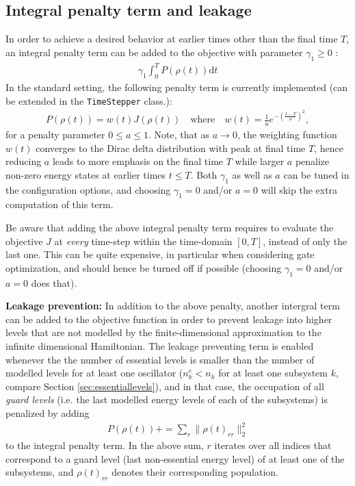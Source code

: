 \documentclass[11pt]{article}
\begin{document}
\subsection{Integral penalty term and leakage}\label{sec:penalty}
In order to achieve a desired behavior at earlier times other than the final time $T$, an integral penalty term can be added to the objective with parameter $\gamma_1 \geq 0$ :
\begin{align}\label{eq:penaltyterm0}
 \gamma_1 \int_0^T P(\rho(t)) \mathrm{d}t
\end{align}
In the standard setting, the following penalty term is currently implemented (can be extended in the \texttt{TimeStepper} class.):
\begin{align}\label{eq:penaltyterm}
  P(\rho(t))  =  w(t) J\left(\rho(t)\right) \quad \text{where} \quad w(t) =
  \frac{1}{a} e^{ -\left(\frac{t-T}{a} \right)^2},
\end{align}
for a penalty parameter $0 \leq a \leq 1$. Note, that as $a\to 0$, the weighting function $w(t)$ converges to the Dirac delta distribution with peak at final time $T$, hence reducing $a$ leads to more emphasis on the final time $T$ while larger $a$ penalize non-zero energy states at earlier times $t\leq T$. Both $\gamma_1$ as well as $a$ can be tuned in the configuration options, and choosing $\gamma_1 = 0$ and/or $a=0$ will skip the extra computation of this term. 

Be aware that adding the above integral penalty term requires to evaluate the objective $J$ at \textit{every} time-step within the time-domain $[0,T]$, instead of only the last one. This can be quite expensive, in particular when considering gate optimization, and should hence be turned off if possible (choosing $\gamma_1=0$ and/or $a=0$ does that).

\textbf{Leakage prevention:}
In addition to the above penalty, another intergral term can be added to the objective function in order to prevent leakage into higher levels that are not modelled by the finite-dimensional approximation to the infinite dimensional Hamiltonian. The leakage preventing term is enabled whenever the the number of essential levels is smaller than the number of modelled levels for at least one oscillator ($n_k^e < n_k$ for at least one subsystem $k$, compare Section \ref{sec:essentiallevels}), and in that case, the occupation of all \textit{guard levels} (i.e. the last modelled energy levels of each of the subsystems) is penalized by adding
\begin{align}\label{eq:leakprevention}
  P(\rho(t)) += \sum_{r} \| \rho(t)_{rr} \|^2_2
\end{align}
to the integral penalty term.
In the above sum, $r$ iterates over all indices that correspond to a guard level (last non-essential energy level) of at least one of the subsystems, and $\rho(t)_{rr}$ denotes their corresponding population. 
\end{document}
